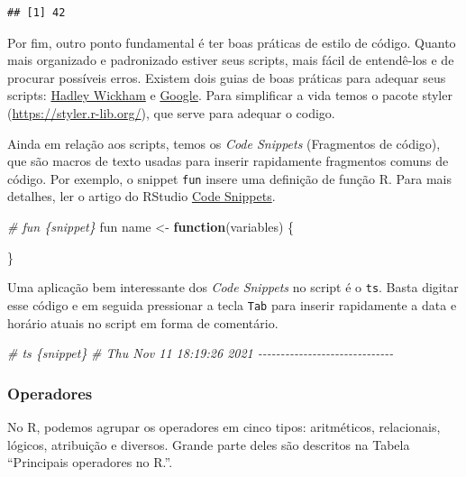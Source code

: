 \documentclass[
]{article}
\newenvironment{Shaded}{\begin{snugshade}}{\end{snugshade}}
\newcommand{\CommentTok}[1]{\textcolor[rgb]{0.56,0.35,0.01}{\textit{#1}}}
\newcommand{\ControlFlowTok}[1]{\textcolor[rgb]{0.13,0.29,0.53}{\textbf{#1}}}
\newcommand{\NormalTok}[1]{#1}
\newcommand{\OtherTok}[1]{\textcolor[rgb]{0.56,0.35,0.01}{#1}}
\begin{document}
\begin{verbatim}
## [1] 42
\end{verbatim}

Por fim, outro ponto fundamental é ter boas práticas de estilo de código. Quanto mais organizado e padronizado estiver seus scripts, mais fácil de entendê-los e de procurar possíveis erros. Existem dois guias de boas práticas para adequar seus scripts: \href{https://adv-r.hadley.nz/index.html}{Hadley Wickham} e \href{https://google.github.io/styleguide/Rguide.xml}{Google}. Para simplificar a vida temos o pacote styler (\url{https://styler.r-lib.org/}), que serve para adequar o codigo.

Ainda em relação aos scripts, temos os \emph{Code Snippets} (Fragmentos de código), que são macros de texto usadas para inserir rapidamente fragmentos comuns de código. Por exemplo, o snippet \texttt{fun} insere uma definição de função R. Para mais detalhes, ler o artigo do RStudio \href{https://support.rstudio.com/hc/en-us/articles/204463668-Code-Snippets}{Code Snippets}.

\begin{Shaded}
\begin{Highlighting}[]
\CommentTok{\# fun \{snippet\}}
\NormalTok{fun}
\NormalTok{name }\OtherTok{\textless{}{-}} \ControlFlowTok{function}\NormalTok{(variables) \{}
    
\NormalTok{\}}
\end{Highlighting}
\end{Shaded}

Uma aplicação bem interessante dos \emph{Code Snippets} no script é o \texttt{ts}. Basta digitar esse código e em seguida pressionar a tecla \texttt{Tab} para inserir rapidamente a data e horário atuais no script em forma de comentário.

\begin{Shaded}
\begin{Highlighting}[]
\CommentTok{\# ts \{snippet\}}
\CommentTok{\# Thu Nov 11 18:19:26 2021 {-}{-}{-}{-}{-}{-}{-}{-}{-}{-}{-}{-}{-}{-}{-}{-}{-}{-}{-}{-}{-}{-}{-}{-}{-}{-}{-}{-}{-}{-}}
\end{Highlighting}
\end{Shaded}

\hypertarget{operadores}{%
\subsubsection{Operadores}\label{operadores}}

No R, podemos agrupar os operadores em cinco tipos: aritméticos, relacionais, lógicos, atribuição e diversos. Grande parte deles são descritos na Tabela ``Principais operadores no R.''.
\end{document}
